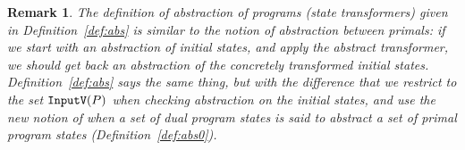 \documentclass[preprint]{sig-alternate-05-2015}
\newtheorem{remark}{Remark}
\def\psd{{\tt{PSd}}}
\def\semd{{\tt{Semd}}}
\def\UndefV{{\tt{InputV}}}
\def\ds{{\mathit{\theta}}}   %
\begin{document}
\begin{remark}
The definition of abstraction of programs (state transformers) given in
Definition~\ref{def:abs} is similar to
the notion of abstraction between primals: if we start with an abstraction
of initial states, and apply the abstract transformer, we should get back
an abstraction of the concretely transformed initial states.
Definition~\ref{def:abs} says the same thing, but with the difference that
we restrict to the set $\UndefV(P)$ when checking abstraction on the initial
states, and use the new notion of when a set of dual program states is
said to abstract a set of primal program states (Definition~\ref{def:abs0}).
\end{remark}



\end{document}

